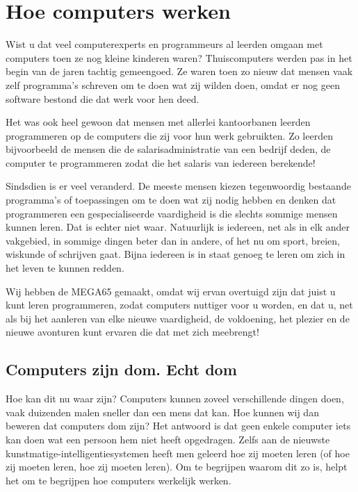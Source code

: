 \chapter{Hoe computers werken}

Wist u dat veel computerexperts en programmeurs al leerden omgaan met computers toen ze nog kleine kinderen waren? Thuiscomputers werden pas in het begin van de jaren tachtig gemeengoed. Ze waren toen zo nieuw dat mensen vaak zelf programma's schreven om te doen wat zij wilden doen, omdat er nog geen software bestond die dat werk voor hen deed.

Het was ook heel gewoon dat mensen met allerlei kantoorbanen leerden programmeren op de computers die zij voor hun werk gebruikten. Zo leerden bijvoorbeeld de mensen die de salarisadministratie van een bedrijf deden, de computer te programmeren zodat die het salaris van iedereen berekende!

Sindsdien is er veel veranderd. De meeste mensen kiezen tegenwoordig bestaande programma's of toepassingen om te doen wat zij nodig hebben en denken dat programmeren een gespecialiseerde vaardigheid is die slechts sommige mensen kunnen leren. Dat is echter niet waar. Natuurlijk is iedereen, net als in elk ander vakgebied, in sommige dingen beter dan in andere, of het nu om sport, breien, wiskunde of schrijven gaat. Bijna iedereen is in staat genoeg te leren om zich in het leven te kunnen redden.

Wij hebben de MEGA65 gemaakt, omdat wij ervan overtuigd zijn dat juist u kunt leren programmeren, zodat computers nuttiger voor u worden, en dat u, net als bij het aanleren van elke nieuwe vaardigheid, de voldoening, het plezier en de nieuwe avonturen kunt ervaren die dat met zich meebrengt!


\section{Computers zijn dom. Echt dom}

Hoe kan dit nu waar zijn? Computers kunnen zoveel verschillende dingen doen, vaak duizenden malen sneller dan een mens dat kan. Hoe kunnen wij dan beweren dat computers dom zijn? Het antwoord is dat geen enkele computer iets kan doen wat een persoon hem niet heeft opgedragen. Zelfs aan de nieuwste kunstmatige-intelligentiesystemen heeft men geleerd hoe zij moeten leren (of hoe zij moeten leren, hoe zij moeten leren). Om te begrijpen waarom dit zo is, helpt het om te begrijpen hoe computers werkelijk werken.

